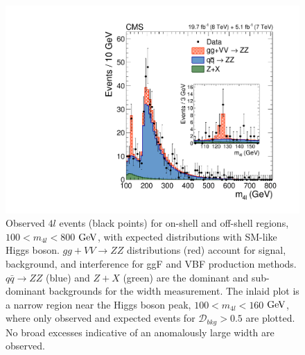 \begin{figure}[htbp]
\begin{center}
\includegraphics[width=.8\linewidth]{HiggsProperties/figures/fig2_new.pdf}
\caption[$m_{4l}$ Distributions of Expected and Observed $4l$ Events in the On-Shell and Off-Shell Regions]{Observed $4l$ events (black points) for on-shell and off-shell regions, $100<m_{4l}<800$ $\rm{GeV}$, with expected distributions with SM-like Higgs boson. $gg + VV \rightarrow ZZ$ distributions (red) account for signal, background, and interference for ggF and VBF production methods. $q\bar{q}\rightarrow ZZ$ (blue) and $Z+X$ (green) are the dominant and sub-dominant backgrounds for the width measurement. The inlaid plot is a narrow region near the Higgs boson peak, $100<m_{4l}<160$ $\rm{GeV}$, where only observed and expected events for $\mathcal{D}_{bkg}>0.5$ are plotted. No broad excesses indicative of an anomalously large width are observed.}
\label{fig:Width4l_Full}
\end{center}
\end{figure}


